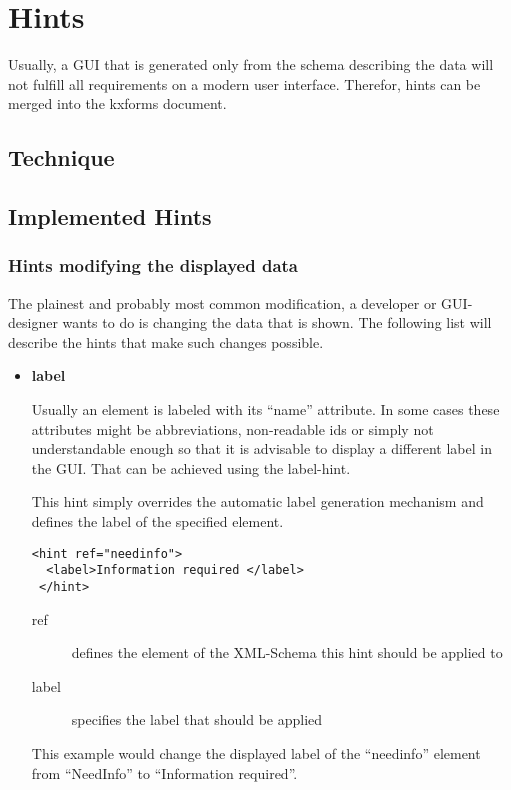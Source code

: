 
\chapter{ Hints}
Usually, a GUI that is generated only from the schema describing the data will not fulfill all requirements on a modern user interface. Therefor, hints can be merged into the kxforms document.

\section{ Technique}






\section{ Implemented Hints}




\subsection{ Hints modifying the displayed data}
The plainest and probably most common modification, a developer or GUI-designer wants to do is changing the data that is shown. The following list will describe the hints that make such changes possible.


\begin{itemize}
 \item \textbf{label}

Usually an element is labeled with its ``name'' attribute. In some cases these attributes might be abbreviations, non-readable ids or simply not understandable enough so that it is advisable to display a different label in the GUI. That can be achieved using the label-hint.

This hint simply overrides the automatic label generation mechanism and defines the label of the specified element.

\begin{lstlisting}[caption=Simple label hint]
 <hint ref="needinfo">
  <label>Information required </label>
 </hint>
 \end{lstlisting}

\begin{description}
 \item[ref] defines the element of the XML-Schema this hint should be applied to
 \item[label] specifies the label that should be applied
 \end{description}

This example would change the displayed label of the ``needinfo'' element from ``NeedInfo'' to ``Information required''.

\end{itemize}



